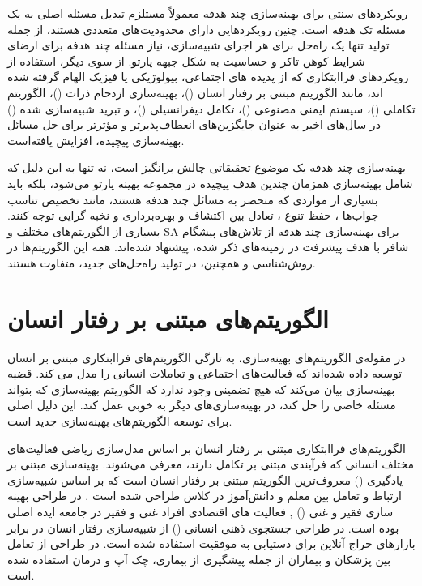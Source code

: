 	رویکردهای سنتی برای بهینه‌سازی چند هدفه معمولاً مستلزم تبدیل مسئله اصلی به یک مسئله تک هدفه است. چنین رویکردهایی دارای محدودیت‌های متعددی هستند، از جمله تولید تنها یک راه‌حل برای هر اجرای شبیه‌سازی، نیاز مسئله چند هدفه برای ارضای شرایط کوهن تاکر و حساسیت به شکل جبهه پارتو. از سوی دیگر، استفاده از رویکردهای فراابتکاری که از پدیده های اجتماعی، بیولوژیکی یا فیزیک الهام گرفته شده اند، مانند الگوریتم مبتنی بر رفتار انسان ()، بهینه‌سازی ازدحام ذرات ()، الگوریتم تکاملی ()، سیستم ایمنی مصنوعی ()، تکامل دیفرانسیلی ()، و تبرید شبیه‌سازی شده () در سال‌های اخیر به عنوان جایگزین‌های انعطاف‌پذیرتر و مؤثرتر برای حل مسائل بهینه‌سازی پیچیده، افزایش یافته‌است.
	
	بهینه‌سازی چند هدفه یک موضوع تحقیقاتی چالش برانگیز است، نه تنها به این دلیل که شامل بهینه‌سازی همزمان چندین هدف پیچیده در مجموعه بهینه پارتو می‌شود، بلکه باید بسیاری از مواردی که منحصر به مسائل چند هدفه هستند، مانند تخصیص تناسب جواب‌ها \cite{article_Farina, Tan2008}
	 ، حفظ تنوع \cite{Khor2005}، تعادل بین اکتشاف و بهره‌برداری 
	 \cite{10.1007/978-3-540-31880-4_30} و نخبه گرایی \cite{laumanns2000a} توجه کنند. بسیاری از الگوریتم‌های مختلف
	   و SA
	   برای بهینه‌سازی چند هدفه از تلاش‌های پیشگام شافر \cite{schaffer1985multiobjective} با هدف پیشرفت در زمینه‌های ذکر شده، پیشنهاد شده‌اند. همه این الگوریتم‌ها در روش‌شناسی و همچنین، در تولید راه‌حل‌های جدید، متفاوت هستند.

\section{ الگوریتم‌های مبتنی بر رفتار انسان}
در مقوله‌ی الگوریتم‌های بهینه‌سازی، به تازگی الگوریتم‌های فراابتکاری مبتنی بر انسان توسعه داده شده‌اند که فعالیت‌های اجتماعی و تعاملات انسانی را مدل می کند.
قضیه بهینه‌سازی  بیان می‌کند که هیچ تضمینی وجود ندارد که الگوریتم بهینه‌سازی که بتواند مسئله خاصی را حل کند، در بهینه‌سازی‌های دیگر به خوبی عمل کند. این دلیل اصلی برای توسعه الگوریتم‌های بهینه‌سازی جدید است.

الگوریتم‌های فراابتکاری مبتنی بر رفتار انسان بر اساس مدل‌سازی ریاضی فعالیت‌های مختلف انسانی که فرآیندی مبتنی بر تکامل دارند، معرفی می‌شوند. بهینه‌سازی مبتنی بر یادگیری () معروف‌ترین الگوریتم مبتنی بر رفتار انسان است که بر اساس شبیه‌سازی ارتباط و تعامل بین معلم و دانش‌آموز در کلاس طراحی شده است
\cite{RAO2011303}.
 در طراحی بهینه سازی فقیر و غنی () \cite{SAMAREHMOOSAVI2019165},
فعالیت های اقتصادی افراد غنی و فقیر در جامعه ایده اصلی بوده است. در طراحی جستجوی ذهنی انسانی ()  \cite{Mousavirad2017} از شبیه‌سازی رفتار انسان در برابر بازارهای حراج آنلاین برای دستیابی به موفقیت استفاده شده است. در طراحی  \cite{app10175791} از تعامل بین پزشکان و بیماران از جمله پیشگیری از بیماری، چک آپ و درمان استفاده شده است.

